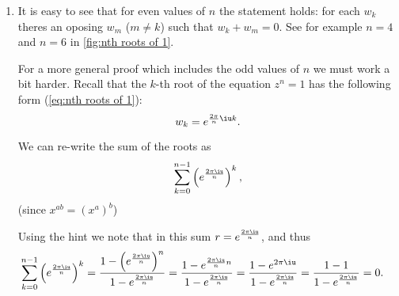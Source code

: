 \begin{enumerate}

	\item It is easy to see that for even values of $n$ the statement holds: for each $w_{k}$ theres an oposing $w_{m}$ ($m\neq k$) such that $w_{k}+w_{m}=0$. See for example $n=4$ and $n=6$ in \autoref{fig:nth roots of 1}.

		For a more general proof which includes the odd values of $n$ we must work a bit harder. Recall that the $k$-th root of the equation $z^{n}=1$ has the following form (\autoref{eq:nth roots of 1}):
		\[
			w_{k} = e^{\frac{2\pi}{n}\iu k}.
		\]

		We can re-write the sum of the roots as
		\[
			\sum\limits_{k=0}^{n-1} \left(e^{\frac{2\pi\iu}{n}}\right)^{k},
		\]
		(since $x^{ab} = (x^{a})^{b}$)

		Using the hint we note that in this sum $r=e^{\frac{2\pi\iu}{n}}$, and thus
		\def\lsk{1.25\normalbaselineskip}
		\begin{align*}
			\sum\limits_{k=0}^{n-1} \left( e^{\frac{2\pi\iu}{n}} \right)^{k} &= \frac{1-\left(e^{\frac{2\pi\iu}{n}}\right)^{n}}{1-e^{\frac{2\pi\iu}{n}}} = \frac{1-e^{\frac{2\pi\iu}{n}n}}{1-e^{\frac{2\pi\iu}{n}}} = \frac{1-e^{2\pi\iu}}{1-e^{\frac{2\pi\iu}{n}}} = \frac{1-1}{1-e^{\frac{2\pi\iu}{n}}} = 0.
		\end{align*}
\end{enumerate}
